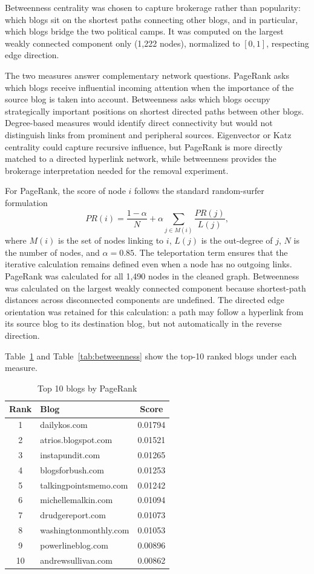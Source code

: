 \documentclass[conference]{IEEEtran}
\begin{document}
Betweenness centrality was chosen to capture brokerage rather than popularity: which blogs sit on the shortest paths connecting other blogs, and in particular, which blogs bridge the two political camps. It was computed on the largest weakly connected component only (1,222 nodes), normalized to $[0,1]$, respecting edge direction.

The two measures answer complementary network questions. PageRank asks which blogs receive influential incoming attention when the importance of the source blog is taken into account. Betweenness asks which blogs occupy strategically important positions on shortest directed paths between other blogs. Degree-based measures would identify direct connectivity but would not distinguish links from prominent and peripheral sources. Eigenvector or Katz centrality could capture recursive influence, but PageRank is more directly matched to a directed hyperlink network, while betweenness provides the brokerage interpretation needed for the removal experiment.

For PageRank, the score of node $i$ follows the standard random-surfer formulation
\[
PR(i) = \frac{1-\alpha}{N} + \alpha \sum_{j\in M(i)} \frac{PR(j)}{L(j)},
\]
where $M(i)$ is the set of nodes linking to $i$, $L(j)$ is the out-degree of $j$, $N$ is the number of nodes, and $\alpha=0.85$. The teleportation term ensures that the iterative calculation remains defined even when a node has no outgoing links. PageRank was calculated for all 1,490 nodes in the cleaned graph. Betweenness was calculated on the largest weakly connected component because shortest-path distances across disconnected components are undefined. The directed edge orientation was retained for this calculation: a path may follow a hyperlink from its source blog to its destination blog, but not automatically in the reverse direction.

Table~\ref{tab:pagerank} and Table~\ref{tab:betweenness} show the top-10 ranked blogs under each measure.

\begin{table}[htbp]
\caption{Top 10 blogs by PageRank}
\label{tab:pagerank}
\centering
\begin{tabular}{@{}clc@{}}
\toprule
Rank & Blog & Score \\
\midrule
1 & dailykos.com & 0.01794 \\
2 & atrios.blogspot.com & 0.01521 \\
3 & instapundit.com & 0.01265 \\
4 & blogsforbush.com & 0.01253 \\
5 & talkingpointsmemo.com & 0.01242 \\
6 & michellemalkin.com & 0.01094 \\
7 & drudgereport.com & 0.01073 \\
8 & washingtonmonthly.com & 0.01053 \\
9 & powerlineblog.com & 0.00896 \\
10 & andrewsullivan.com & 0.00862 \\
\bottomrule
\end{tabular}
\end{table}
\end{document}

